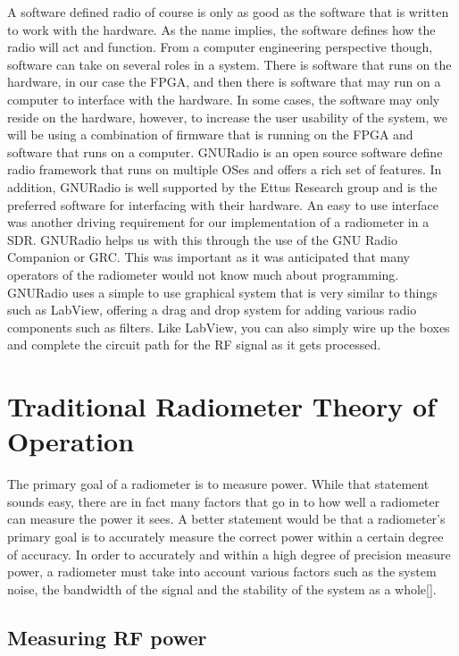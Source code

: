 A software defined radio of course is only as good as the software that is written to work with the hardware.  As the name implies, the software defines how the radio will act and function.  From a computer engineering perspective though, software can take on several roles in a system.  There is software that runs on the hardware, in our case the FPGA, and then there is software that may run on a computer to interface with the hardware.  In some cases, the software may only reside on the hardware, however, to increase the user usability of the system, we will be using a combination of firmware that is running on the FPGA and software that runs on a computer.  GNURadio is an open source software define radio framework that runs on multiple OSes and offers a rich set of features.  In addition, GNURadio is well supported by the Ettus Research group and is the preferred software for interfacing with their hardware.  An easy to use interface was another driving requirement for our implementation of a radiometer in a SDR.  GNURadio helps us with this through the use of the GNU Radio Companion or GRC.  This was important as it was anticipated that many operators of the radiometer would not know much about programming.  GNURadio uses a simple to use graphical system that is very similar to things such as LabView, offering a drag and drop system for adding various radio components such as filters.  Like LabView, you can also simply wire up the boxes and complete the circuit path for the RF signal as it gets processed.

\section{Traditional Radiometer Theory of Operation}

The primary goal of a radiometer is to measure power.  While that statement sounds easy, there are in fact many factors that go in to how well a radiometer can measure the power it sees.  A better statement would be that a radiometer's primary goal is to accurately measure the correct power within a certain degree of accuracy.  In order to accurately and within a high degree of precision measure power, a radiometer must take into account various factors such as the system noise, the bandwidth of the signal and the stability of the system as a whole[\cite{Evans}].  

\subsection{Measuring RF power}

